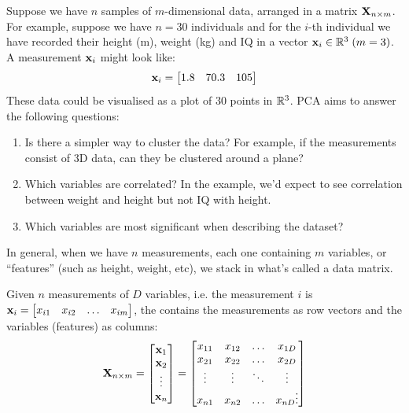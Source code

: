 \documentclass[a4paper]{article}
\begin{document}
Suppose we have $n$ samples of $m$-dimensional data, arranged in a matrix $\textbf{X}_{n\times m}$. For example, suppose we have $n=30$ individuals and for the $i$-th individual we have recorded their height (m), weight (kg) and IQ in a vector $\textbf{x}_i \in \mathbb{R}^{3}\; (m=3)$. A measurement $\textbf{x}_i$ might look like:
\[
\textbf{x}_i = \begin{bmatrix}1.8 & 70.3 & 105 \end{bmatrix}
\]
These data could be visualised as a plot of $30$ points in $\mathbb{R}^3$. PCA aims to answer the following questions:
\begin{enumerate}
    \item Is there a simpler way to cluster the data? For example, if the measurements consist of 3D data, can they be clustered around a plane?
    \item Which variables are correlated? In the example, we'd expect to see correlation between weight and height but not IQ with height.
    \item Which variables are most significant when describing the dataset?
\end{enumerate}
In general, when we have $n$ measurements, each one containing $m$ variables, or ``features'' (such as height, weight, etc), we stack in what's called a data matrix.
\begin{definition}
Given $n$ measurements of $D$ variables, i.e. the measurement $i$ is $\textbf{x}_i = \begin{bmatrix}x_{i1} & x_{i2} & \ldots & x_{im}\end{bmatrix}$, the  contains the measurements as row vectors and the variables (features) as columns:
\begin{equation}
    \textbf{X}_{n\times m} = \begin{bmatrix}\textbf{x}_1 \\ \textbf{x}_2  \\ \vdots \\ \textbf{x}_n \end{bmatrix} = 
    \begin{bmatrix}
    x_{11} & x_{12} & \ldots & x_{1D} \\
    x_{21} & x_{22} & \ldots & x_{2D} \\
    \vdots & \vdots & \ddots & \vdots \\
    x_{n1} & x_{n2} & \ldots & x_{nD}
    \vdots
    \end{bmatrix}
\end{equation}
\end{definition}
\end{document}
